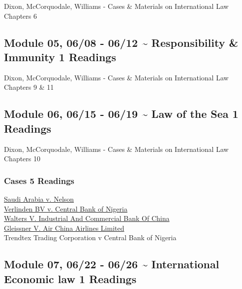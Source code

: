 \documentclass[10pt,]{article}
\begin{document}
Dixon, McCorquodale, Williams - Cases \& Materials on International Law
Chapters 6

\hypertarget{module-05-0608---0612-responsibility-immunity-1-readings}{%
\subsection{Module 05, 06/08 - 06/12 \textasciitilde{} Responsibility \&
Immunity \textbar{} 1
Readings}\label{module-05-0608---0612-responsibility-immunity-1-readings}}

Dixon, McCorquodale, Williams - Cases \& Materials on International Law
Chapters 9 \& 11

\hypertarget{module-06-0615---0619-law-of-the-sea-1-readings}{%
\subsection{Module 06, 06/15 - 06/19 \textasciitilde{} Law of the Sea
\textbar{} 1
Readings}\label{module-06-0615---0619-law-of-the-sea-1-readings}}

Dixon, McCorquodale, Williams - Cases \& Materials on International Law
Chapters 10

\hypertarget{cases-5-readings}{%
\subsubsection{Cases \textbar{} 5 Readings}\label{cases-5-readings}}

\href{https://scholar.google.com/scholar_case?case=15997705832480823650}{Saudi
Arabia v. Nelson}\\
\href{https://scholar.google.com/scholar_case?case=12305885770783175808}{Verlinden
BV v. Central Bank of Nigeria}\\
\href{https://www.courtlistener.com/opinion/2502147/walters-v-industrial-and-commercial-bank-of-china/}{Walters
V. Industrial And Commercial Bank Of China}\\
\href{https://scholar.google.com/scholar_case?case=3908553268744923367}{Gleissner
V. Air China Airlines Limited}\\
Trendtex Trading Corporation v Central Bank of Nigeria

\hypertarget{module-07-0622---0626-international-economic-law-1-readings}{%
\subsection{Module 07, 06/22 - 06/26 \textasciitilde{} International
Economic law \textbar{} 1
Readings}\label{module-07-0622---0626-international-economic-law-1-readings}}
\end{document}
